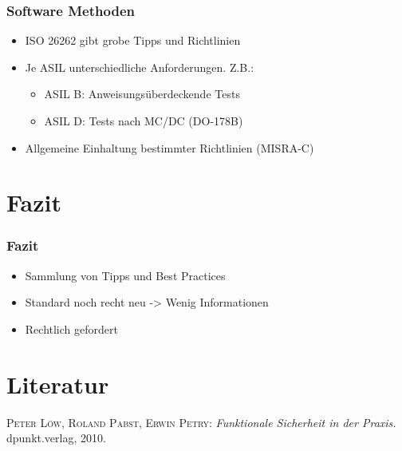 \documentclass[]{beamer}
\begin{document}
\begin{frame}
\frametitle{Software Methoden}

\begin{itemize}
    \item ISO 26262 gibt grobe Tipps und Richtlinien
    \item Je ASIL unterschiedliche Anforderungen. Z.B.:
    \begin{itemize}
        \item ASIL B: Anweisungsüberdeckende Tests
        \item ASIL D: Tests nach MC/DC (DO-178B)
    \end{itemize}
    \item Allgemeine Einhaltung bestimmter Richtlinien (MISRA-C)
\end{itemize}

\end{frame}



\section{Fazit}
\label{sec:Fazit}

\begin{frame}
\frametitle{Fazit}

\begin{itemize}
    \item Sammlung von Tipps und Best Practices
    \item Standard noch recht neu -> Wenig Informationen
    \item Rechtlich gefordert
\end{itemize}

\end{frame}








\appendix
\section*{Literatur}
\label{sec:Literatur}

\begin{frame}
\begin{thebibliography}{10}

 \textsc{Peter Löw, Roland Pabst, Erwin Petry}: {\em Funktionale Sicherheit in der Praxis.} dpunkt.verlag, 2010.

\end{thebibliography}
\end{frame}
\end{document}
